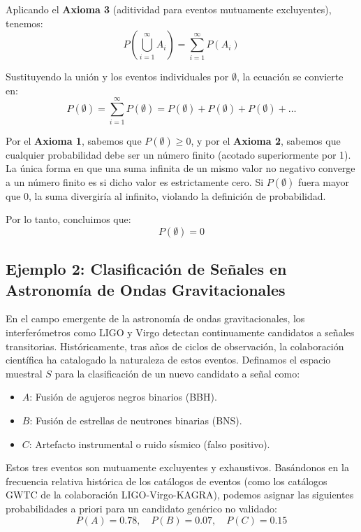 Aplicando el \textbf{Axioma 3} (aditividad para eventos mutuamente excluyentes), tenemos:
$$ P\left(\bigcup_{i=1}^{\infty} A_i\right) = \sum_{i=1}^{\infty} P(A_i) $$

Sustituyendo la unión y los eventos individuales por $\emptyset$, la ecuación se convierte en:
$$ P(\emptyset) = \sum_{i=1}^{\infty} P(\emptyset) = P(\emptyset) + P(\emptyset) + P(\emptyset) + \dots $$

Por el \textbf{Axioma 1}, sabemos que $P(\emptyset) \ge 0$, y por el \textbf{Axioma 2}, sabemos que cualquier probabilidad debe ser un número finito (acotado superiormente por 1). La única forma en que una suma infinita de un mismo valor no negativo converge a un número finito es si dicho valor es estrictamente cero. Si $P(\emptyset)$ fuera mayor que 0, la suma divergiría al infinito, violando la definición de probabilidad. 

Por lo tanto, concluimos que:
$$ P(\emptyset) = 0 $$

\subsection{Ejemplo 2: Clasificación de Señales en Astronomía de Ondas Gravitacionales}

En el campo emergente de la astronomía de ondas gravitacionales, los interferómetros como LIGO y Virgo detectan continuamente candidatos a señales transitorias. Históricamente, tras años de ciclos de observación, la colaboración científica ha catalogado la naturaleza de estos eventos. Definamos el espacio muestral $S$ para la clasificación de un nuevo candidato a señal como:
\begin{itemize}
    \item $A$: Fusión de agujeros negros binarios (BBH).
    \item $B$: Fusión de estrellas de neutrones binarias (BNS).
    \item $C$: Artefacto instrumental o ruido sísmico (falso positivo).
\end{itemize}

Estos tres eventos son mutuamente excluyentes y exhaustivos. Basándonos en la frecuencia relativa histórica de los catálogos de eventos (como los catálogos GWTC de la colaboración LIGO-Virgo-KAGRA), podemos asignar las siguientes probabilidades a priori para un candidato genérico no validado:
$$ P(A) = 0.78, \quad P(B) = 0.07, \quad P(C) = 0.15 $$

